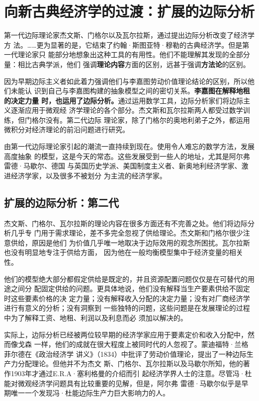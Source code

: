 \chapter{向新古典经济学的过渡：扩展的边际分析}

第一代边际理论家杰文斯、门格尔以及瓦尔拉斯，通过提出边际分析改变了经济学方
法。……更为显著的是，它结束了约翰·斯图亚特·穆勒的古典经济学。但是第一代理论家只
能部分地想象出这种工具的有用性。他们不能理解其发现的全部分量：相比古典学派，他们
强调\textbf{理论内容}方面的区别，远甚于强调\textbf{方法论}的区别。

因为早期边际主义者如此着力强调他们与李嘉图劳动价值理论结论的区别，所以他们未能认
识到自己与李嘉图构建的抽象模型之间的密切关系。\textbf{李嘉图在解释地租的决定力量
  时，也运用了边际分析。}通过运用数学工具，边际分析家们将边际主义逐渐应用于微观经
济学理论的各个部分。杰文斯和瓦尔拉斯两人都受过数学训练，但门格尔没有。第二代边际
理论家，除了门格尔的奥地利弟子之外，都运用微积分对经济理论的前沿问题进行研究。

由第一代边际理论家引起的潮流一直持续到现在。使用令人难忘的数学方法，发展高度抽象
的模型，这是今天的常态。这些发展受到一些人的地址，尤其是阿尔弗雷德·马歇尔、德国
与英国历史学派、美国制度主义者、新奥地利经济学家、激进经济学家，以及很多不被划分
为主流的经济学家。

\section{扩展的边际分析：第二代}

杰文斯、门格尔、瓦尔拉斯的理论内容在很多方面还有不完善之处。他们将边际分析几乎专
门用于需求理论，差不多完全忽视了供给理论。杰文斯和门格尔很少注意供给，原因是他们
为价值几乎唯一地取决于边际效用的观念所困扰。瓦尔拉斯也没有明显地专注于供给方面，
因为他在一般均衡模型集中于经济变量的相关性。

他们的模型绝大部分都假定供给是既定的，并且资源配置问题仅仅是在可替代的用途之间分
配固定供给的问题。更具体地说，他们没有解释当生产要素供给不固定时这些要素价格的决
定力量；没有解释收入分配的决定力量；没有对厂商经济学进行有意义的分析；没有洞察到
一些独特的问题，这些问题是在发展理论的过程中为了解释工资、地租、利润以及利息而必
须加以解决的。

实际上，边际分析已经被两位较早期的经济学家应用于要素定价和收入分配中，然而像戈森
一样，他们的成就在很大程度上被同时代的人忽视了。蒙迪福特·兰格菲尔德在《政治经济学
讲义》（1834）中批评了劳动价值理论，提出了一种边际生产力分配理论。但他并不为杰文
斯、门格尔、瓦尔拉斯以及马歇尔所知，他的著作1903年才通过E.R.A·塞利格曼的介绍而引
起经济学界人士的注意。尽管冯·杜能对微观经济学问题具有比较重要的见解，但是，阿尔弗
雷德·马歇尔似乎是早期唯一一个发现冯·杜能边际生产力巨大影响力的人。

